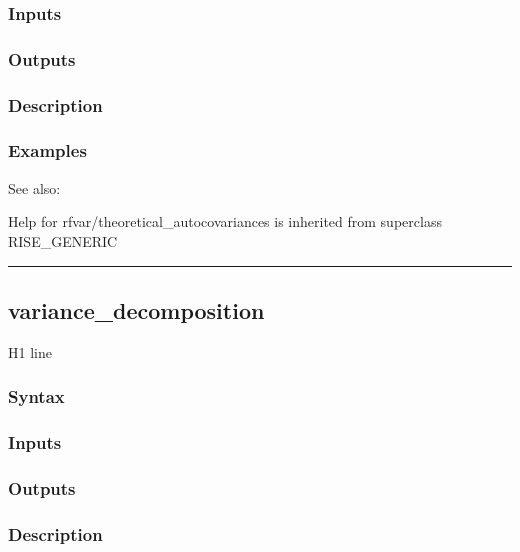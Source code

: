 \documentclass[letterpaper,10pt,english]{sphinxmanual}
\begin{document}
\subsubsection{Inputs}
\label{classes/models/@rfvar/rfvar:id156}

\subsubsection{Outputs}
\label{classes/models/@rfvar/rfvar:id157}

\subsubsection{Description}
\label{classes/models/@rfvar/rfvar:id158}

\subsubsection{Examples}
\label{classes/models/@rfvar/rfvar:id159}
See also:

Help for rfvar/theoretical\_autocovariances is inherited from superclass RISE\_GENERIC


\bigskip\hrule{}\bigskip



\subsection{variance\_decomposition}
\label{classes/models/@rfvar/rfvar:id160}\label{classes/models/@rfvar/rfvar:variance-decomposition}
H1 line


\subsubsection{Syntax}
\label{classes/models/@rfvar/rfvar:id161}

\subsubsection{Inputs}
\label{classes/models/@rfvar/rfvar:id162}

\subsubsection{Outputs}
\label{classes/models/@rfvar/rfvar:id163}

\subsubsection{Description}
\label{classes/models/@rfvar/rfvar:id164}
\end{document}
